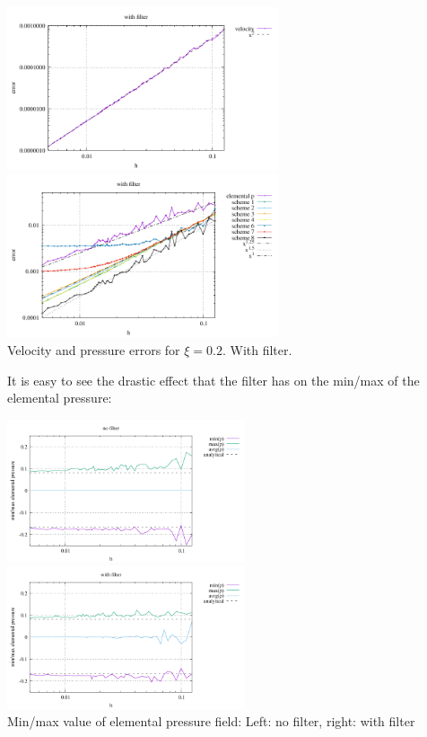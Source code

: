 \begin{center}
\includegraphics[width=8cm]{python_codes/fieldstone_12/results/rand/errorsV_filter}
\includegraphics[width=8cm]{python_codes/fieldstone_12/results/rand/errorsP_filter}\\
{\captionfont Velocity and pressure errors for $\xi=0.2$. With filter.} 
\end{center}

It is easy to see the drastic effect that the filter has on the min/max of the elemental pressure:
\begin{center}
\includegraphics[width=7cm]{python_codes/fieldstone_12/results/rand/rawp_nofilter}
\includegraphics[width=7cm]{python_codes/fieldstone_12/results/rand/rawp_filter}\\
{\captionfont Min/max value of elemental pressure field: Left: no filter, right: with filter}
\end{center}

